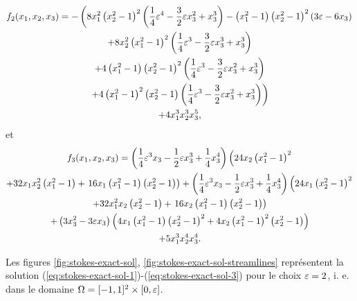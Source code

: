 \begin{multline}
  f_2(x_1, x_2, x_3) =
  -\left(8x_1^2 \left( x_2^2 - 1 \right)^2
    \left( \frac{1}{4}\varepsilon ^4
      - \frac{3}{2}\varepsilon x_3^2 + x_3^3 \right)
    - \left( x_1^2 - 1 \right)
    \left( x_2^2 - 1 \right)^2
    \left( 3\varepsilon  - 6x_3 \right)\right.\\
    + 8x_2^2
    \left( x_1^2-1 \right)^2
    \left( \frac{1}{4}\varepsilon ^3 - \frac{3}{2}\varepsilon x_3^3 + x_3^3 \right)\\
    + 4\left( x_1^2 - 1 \right)
    \left( x_2^2 - 1 \right)^2
    \left( \frac{1}{4}\varepsilon ^3 -\frac{3}{2} \varepsilon x_3^2 + x_3^3 \right)\\
    \left. + 4\left( x_1^2 - 1 \right)^2\left( x_2^2 - 1 \right)
    \left( \frac{1}{4}\varepsilon ^3 -\frac{3}{2} \varepsilon x_3^2 + x_3^3 \right)\right)\\
    + 4x_1^3 x_2^3x_3^5,
\end{multline}
et
\begin{multline}
  f_3(x_1, x_2, x_3) =
  \left( \frac{1}{4}\varepsilon ^3x_3 - \frac{1}{2} \varepsilon  x_3^3
    + \frac{1}{4}x_3^4 \right) \left(24 x_2
  \left( x_1^2 - 1 \right)^2\right.\\
  + 32x_1x_2^2\left( x_1^2 - 1 \right)
  + \left.16x_1\left( x_1^2 - 1 \right)\left( x_2^2 - 1 \right)\right)
  + \left( \frac{1}{4}\varepsilon ^3x_3 - \frac{1}{2} \varepsilon
    x_3^3 + \frac{1}{4}x_3^4 \right)
  \left(24 x_1 \left( x_2^2 - 1 \right)^2\right.\\
  + 32x_1^2x_2\left( x_2^2 - 1 \right)
  + \left.16x_2\left( x_1^2 - 1 \right)\left( x_2^2 - 1 \right)\right)\\
  + \left( 3x_3^2 - 3\varepsilon x_3 \right)
  \left( 4x_1\left( x_1^2 - 1 \right)
    \left( x_2^2 - 1 \right)^2
    + 4x_2\left( x_1^2 - 1 \right)^2\left( x_2^2 - 1 \right) \right)\\
  + 5x_1^3x_2^4x_3^4.
\end{multline}

Les figures \ref{fig:stokes-exact-sol},
\ref{fig:stokes-exact-sol-streamlines} représentent la solution
(\ref{eq:stokes-exact-sol-1})-(\ref{eq:stokes-exact-sol-3}) pour le
choix $\varepsilon = 2$, i. e. dans le domaine $\Omega =
[-1,1]^2\times[0,\varepsilon]$.

